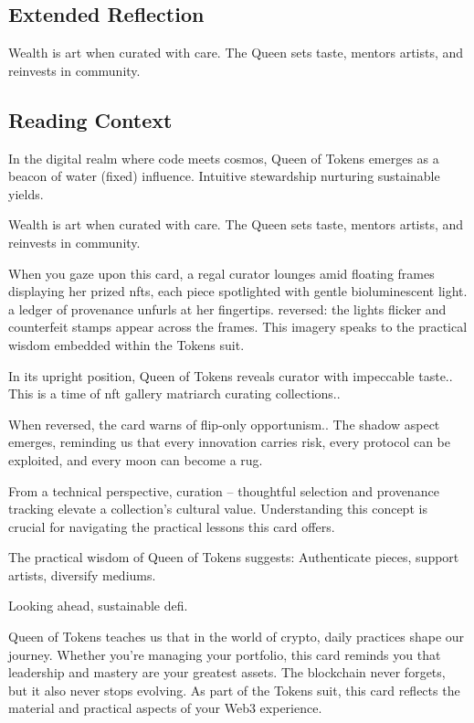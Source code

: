 \documentclass[11pt,oneside]{book}
\begin{document}
\begin{minipage}[t]{0.55\textwidth}
  \subsection*{Extended Reflection}
  Wealth is art when curated with care. The Queen sets taste, mentors artists, and reinvests in community.

  \subsection*{Reading Context}
  In the digital realm where code meets cosmos, Queen of Tokens emerges as a beacon of water (fixed) influence. Intuitive stewardship nurturing sustainable yields.

  Wealth is art when curated with care. The Queen sets taste, mentors artists, and reinvests in community.

  When you gaze upon this card, a regal curator lounges amid floating frames displaying her prized nfts, each piece spotlighted with gentle bioluminescent light. a ledger of provenance unfurls at her fingertips. reversed: the lights flicker and counterfeit stamps appear across the frames. This imagery speaks to the practical wisdom embedded within the Tokens suit.

  In its upright position, Queen of Tokens reveals curator with impeccable taste.. This is a time of nft gallery matriarch curating collections..

  When reversed, the card warns of flip-only opportunism.. The shadow aspect emerges, reminding us that every innovation carries risk, every protocol can be exploited, and every moon can become a rug.

  From a technical perspective, curation – thoughtful selection and provenance tracking elevate a collection's cultural value. Understanding this concept is crucial for navigating the practical lessons this card offers.

  The practical wisdom of Queen of Tokens suggests: Authenticate pieces, support artists, diversify mediums.

  Looking ahead, sustainable defi.

  Queen of Tokens teaches us that in the world of crypto, daily practices shape our journey. Whether you're managing your portfolio, this card reminds you that leadership and mastery are your greatest assets. The blockchain never forgets, but it also never stops evolving. As part of the Tokens suit, this card reflects the material and practical aspects of your Web3 experience.

\end{minipage}
\end{document}
